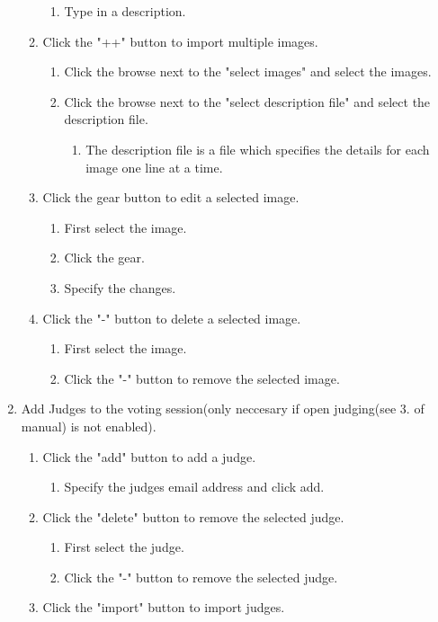 \documentclass[10pt,a4paper]{article}
\begin{document}
\begin{enumerate}
\begin{enumerate}
\begin{enumerate}
\item Type in a description.
\end{enumerate}
\item Click the "++" button to import multiple images.
\begin{enumerate}
\item Click the browse next to the "select images" and select the images.
\item Click the browse next to the "select description file" and select the description file.
\begin{enumerate}
\item The description file is a file which specifies the details for each image one line at a time.
\end{enumerate}
\end{enumerate}
\item Click the gear button to edit a selected image.
\begin{enumerate}
\item First select the image.
\item Click the gear.
\item Specify the changes.
\end{enumerate}
\item Click the "-" button to delete a selected image.
\begin{enumerate}
\item First select the image.
\item Click the "-" button to remove the selected image.
\end{enumerate}
\end{enumerate}
\item Add Judges to the voting session(only neccesary if open judging(see 3. of manual) is not enabled).
\begin{enumerate}
\item Click the "add" button to add a judge.
\begin{enumerate}
\item Specify the judges email address and click add.
\end{enumerate}
\item Click the "delete" button to remove the selected judge.
\begin{enumerate}
\item First select the judge.
\item Click the "-" button to remove the selected judge.
\end{enumerate}
\item Click the "import" button to import judges.

\end{enumerate}
\end{enumerate}
\end{document}
